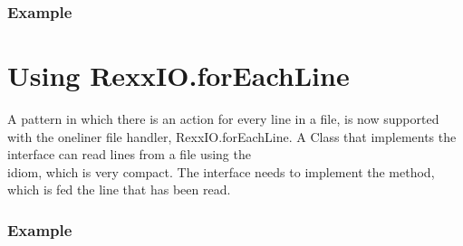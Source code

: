 {\subsubsection{Example}



\section{Using RexxIO.forEachLine }

A pattern in which there is an action for every line in a file, is now supported with the oneliner
file handler, RexxIO.forEachLine. A Class that implements the
interface  can read lines from a file using the \\
 idiom, which is
very compact. The  interface needs to implement
the  method, which is fed the line that has been read.

\subsubsection{Example}







}
